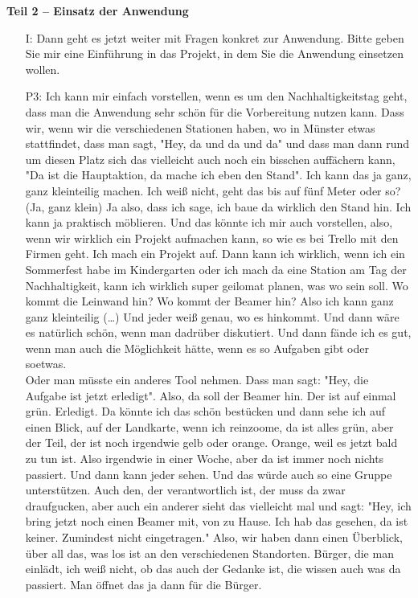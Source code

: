 \textbf{Teil 2 -- Einsatz der Anwendung}
\begin{itemize}
    \item[I:] Dann geht es jetzt weiter mit Fragen konkret zur Anwendung. Bitte geben Sie mir eine Einf{\"u}hrung in das Projekt, in dem Sie die Anwendung einsetzen wollen.
    \item[P3:] Ich kann mir einfach vorstellen, wenn es um den Nachhaltigkeitstag geht, dass man die Anwendung sehr sch{\"o}n f{\"u}r die Vorbereitung nutzen kann. Dass wir, wenn wir die verschiedenen Stationen haben, wo in M{\"u}nster etwas stattfindet, dass man sagt, "Hey, da und da und da" und dass man dann rund um diesen Platz sich das vielleicht auch noch ein bisschen auff{\"a}chern kann, "Da ist die Hauptaktion, da mache ich eben den Stand". Ich kann das ja ganz, ganz kleinteilig machen. Ich wei{\ss} nicht, geht das bis auf f{\"u}nf Meter oder so? (Ja, ganz klein) Ja also, dass ich sage, ich baue da wirklich den Stand hin. Ich kann ja praktisch m{\"o}blieren. Und das k{\"o}nnte ich mir auch vorstellen, also, wenn wir wirklich ein Projekt aufmachen kann, so wie es bei Trello mit den Firmen geht. Ich mach ein Projekt auf. Dann kann ich wirklich, wenn ich ein Sommerfest habe im Kindergarten oder ich mach da eine Station am Tag der Nachhaltigkeit, kann ich wirklich super geilomat planen, was wo sein soll. Wo kommt die Leinwand hin? Wo kommt der Beamer hin? Also ich kann ganz ganz kleinteilig (\dots) Und jeder wei{\ss} genau, wo es hinkommt. Und dann w{\"a}re es nat{\"u}rlich sch{\"o}n, wenn man dadr{\"u}ber diskutiert. Und dann f{\"a}nde ich es gut, wenn man auch die M{\"o}glichkeit h{\"a}tte, wenn es so Aufgaben gibt oder soetwas.\\
    Oder man m{\"u}sste ein anderes Tool nehmen. Dass man sagt: "Hey, die Aufgabe ist jetzt erledigt". Also, da soll der Beamer hin. Der ist auf einmal gr{\"u}n. Erledigt. Da k{\"o}nnte ich das sch{\"o}n best{\"u}cken und dann sehe ich auf einen Blick, auf der Landkarte, wenn ich reinzoome, da ist alles gr{\"u}n, aber der Teil, der ist noch irgendwie gelb oder orange. Orange, weil es jetzt bald zu tun ist. Also irgendwie in einer Woche, aber da ist immer noch nichts passiert. Und dann kann jeder sehen. Und das w{\"u}rde auch so eine Gruppe unterst{\"u}tzen. Auch den, der verantwortlich ist, der muss da zwar draufgucken, aber auch ein anderer sieht das vielleicht mal und sagt: "Hey, ich bring jetzt noch einen Beamer mit, von zu Hause. Ich hab das gesehen, da ist keiner. Zumindest nicht eingetragen." Also, wir haben dann einen {\"U}berblick, {\"u}ber all das, was los ist an den verschiedenen Standorten. B{\"u}rger, die man einl{\"a}dt, ich wei{\ss} nicht, ob das auch der Gedanke ist, die wissen auch was da passiert. Man {\"o}ffnet das ja dann f{\"u}r die B{\"u}rger.\\

\end{itemize}
